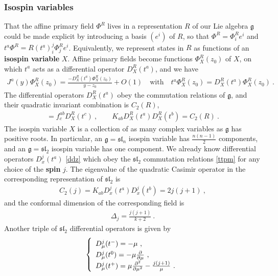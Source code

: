 \documentclass[12pt, a4paper, notitlepage, twoside]{report}
\numberwithin{equation}{section}
\theoremstyle{break}
\begin{document}
\subsubsection{Isospin variables}

That the affine primary field $\Phi^R$ lives in a representation $R$ of our Lie algebra $\mathfrak{g}$ could be made explicit by introducing  a basis $(e^i)$ of $R$, so that $\Phi^{R} = \Phi^{R}_ie^i$ and $t^a \Phi^{R} = R(t^a)_i^j \Phi^{R}_je^i$.
Equivalently, we represent states in $R$ 
as functions of an \textbf{\boldmath isospin variable} $X$. 
Affine primary fields become functions $\Phi^R_X(z_0)$ of $X$, on which $t^a$ acts as a differential operator $D_X^R(t^a)$, 
and we have
\begin{align}
 J^a(y)\Phi^R_X(z_0) = \frac{-D^R_X(t^a)\Phi^R_X(z_0)}{y-z_0}+O(1)\quad \text{with} \quad t^a \Phi^R_X(z_0) = D_X^R(t^a) \Phi^R_X(z_0)\ .
\label{jprx}
\end{align}
The differential operators $D_X^R(t^a)$ obey the commutation relations of $\mathfrak{g}$, and their quadratic invariant combination is $C_2(R)$,
\begin{align}
[D_X^R(t^a),D_X^R(t^b)] = f^{ab}_c D_X^R(t^c)\ , \qquad K_{ab} D_X^R(t^a)D_X^R(t^b) = C_2(R)\ .
\label{dta}
\end{align}
The isospin variable $X$ is a collection of as many complex variables as $\mathfrak{g}$ has positive roots.
In particular, an $\mathfrak{g}=\mathfrak{sl}_n$ isospin variable has $\frac{n(n-1)}{2}$ components, and an $\mathfrak{g}=\mathfrak{sl}_2$ isospin variable has one component.
We already know differential operators $D^j_x(t^a)$ \eqref{ddz} which 
obey the $\mathfrak{sl}_2$ commutation relations \eqref{ttpm} for any choice of the 
\textbf{\boldmath spin} $j$.
The eigenvalue of the quadratic Casimir operator in the corresponding representation of $\mathfrak{sl}_2$ is
\begin{align}
 C_2(j) =  K_{ab}D_x^j(t^a)D_x^j(t^b) = 2j(j+1)\ ,
\end{align}
and the conformal dimension of the corresponding field is
\begin{align}
 \Delta_j =\frac{j(j+1)}{k+2}\ .
\label{dj}
\end{align}
Another triple of $\mathfrak{sl}_2$ differential operators is given by 
\begin{align}
\renewcommand{\arraystretch}{1.3}
\left\{\begin{array}{l}  
 D_\mu^j(t^-) = -\mu \ , \\  D_\mu^j(t^0) = -\mu{\frac{\partial}{\partial \mu}} \ , \\ D_\mu^j(t^+) = \mu\frac{\partial^2}{\partial\mu^2} -\frac{j(j+1)}{\mu}\ . \end{array}\right. 
\label{mub}
\end{align}
\end{document}

